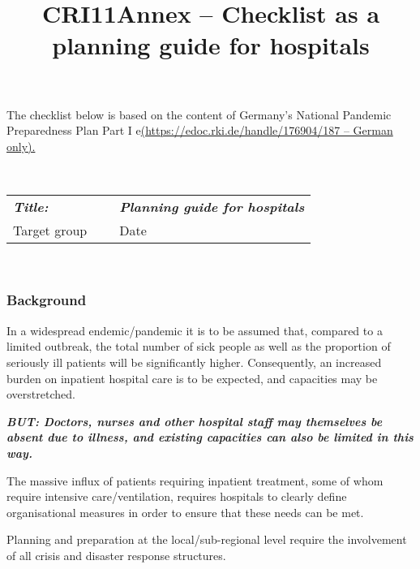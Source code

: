 \documentclass{article}
\begin{document}
\title{CRI11Annex – Checklist as a planning guide for hospitals}

\maketitle





The checklist below is based on the content of Germany's National Pandemic Preparedness Plan Part I e\href{file:///C:\Users\boesl_reg\AppData\Local\Microsoft\Windows\INetCache\Content.Outlook\SFW45WES\(https:\edoc.rki.de\handle\176904\187%20–%20German%20only)}{(https://edoc.rki.de/handle/176904/187 – German only).}





 


\begin{tabu} to \textwidth { |X|X|X| }
\hline



\emph{\textbf{Title:}} &  & \emph{\textbf{Planning guide for hospitals}}
 \\


Target group &   & Date
 \\
\hline

\end{tabu}

 


\subsubsection{Background}\label{H7945097}



In a widespread endemic/pandemic it is to be assumed that, compared to a limited outbreak, the total number of sick people as well as the proportion of seriously ill patients will be significantly higher. Consequently, an increased burden on inpatient hospital care is to be expected, and capacities may be overstretched.


\emph{\textbf{BUT: Doctors, nurses and other hospital staff may themselves be absent due to illness, and existing capacities can also be limited in this way.}}


The massive influx of patients requiring inpatient treatment, some of whom require intensive care/ventilation, requires hospitals to clearly define organisational measures in order to ensure that these needs can be met.


Planning and preparation at the local/sub-regional level require the involvement of all crisis and disaster response structures. 
\end{document}
